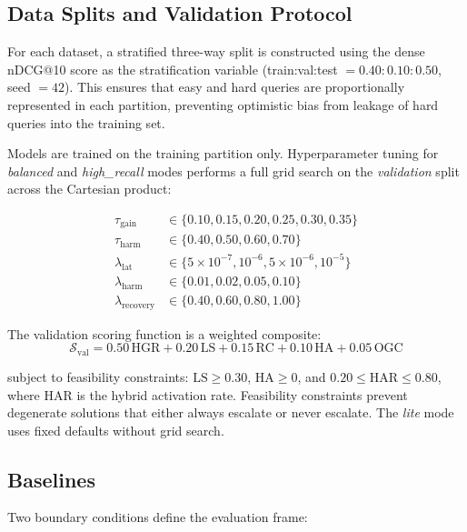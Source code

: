 \documentclass[journal]{IEEEtran}
\begin{document}
\subsection{Data Splits and Validation Protocol}
\label{sec:splits}

For each dataset, a stratified three-way split is constructed
using the dense nDCG@10 score as the stratification variable
(train:val:test $= 0.40:0.10:0.50$, seed $= 42$). This
ensures that easy and hard queries are proportionally represented
in each partition, preventing optimistic bias from leakage of hard
queries into the training set.

Models are trained on the training partition only.
Hyperparameter tuning for \textit{balanced} and
\textit{high\_recall} modes performs a full grid search on the
\emph{validation} split across the Cartesian product:

\begin{align*}
\tau_{\text{gain}} &\in \{0.10, 0.15, 0.20, 0.25, 0.30, 0.35\} \\
\tau_{\text{harm}} &\in \{0.40, 0.50, 0.60, 0.70\} \\
\lambda_{\text{lat}} &\in \{5\!\times\!10^{-7}, 10^{-6},
                              5\!\times\!10^{-6}, 10^{-5}\} \\
\lambda_{\text{harm}} &\in \{0.01, 0.02, 0.05, 0.10\} \\
\lambda_{\text{recovery}} &\in \{0.40, 0.60, 0.80, 1.00\}
\end{align*}

The validation scoring function is a weighted composite:
\begin{equation}
\label{eq:valscore}
\mathcal{S}_{\text{val}} = 0.50\,\text{HGR}
  + 0.20\,\text{LS}
  + 0.15\,\text{RC}
  + 0.10\,\text{HA}
  + 0.05\,\text{OGC}
\end{equation}

subject to feasibility constraints:
$\text{LS} \geq 0.30$, $\text{HA} \geq 0$, and
$0.20 \leq \text{HAR} \leq 0.80$, where HAR is the hybrid
activation rate. Feasibility constraints prevent degenerate
solutions that either always escalate or never escalate.
The \textit{lite} mode uses fixed defaults without grid search.

\subsection{Baselines}
\label{sec:baselines}

Two boundary conditions define the evaluation frame:
\end{document}
